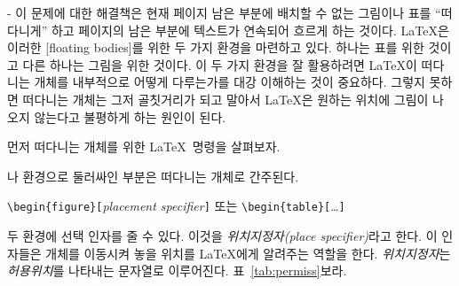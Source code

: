 \begin{adjustwidth}{0pt}{-\margheadwidth}
이 문제에 대한 해결책은 현재 페이지 남은 부분에 배치할 수 없는 그림이나 표를 ``떠다니게''
하고 페이지의 남은 부분에 텍스트가 연속되어 흐르게 하는 것이다.
\LaTeX 은 이러한 [floating bodies]를 위한 두 가지 환경을 마련하고 있다.
하나는 표를 위한 것이고 다른 하나는 그림을 위한 것이다.
이 두 가지 환경을 잘 활용하려면 \LaTeX 이 떠다니는 개체를 내부적으로 어떻게 다루는가를 
대강 이해하는 것이 중요하다.
그렇지 못하면 떠다니는 개체는 그저 골칫거리가 되고 말아서 \LaTeX 은 원하는 위치에 그림이 나오지 
않는다고 불평하게 하는 원인이 된다.

\bigskip
먼저 떠다니는 개체를 위한 \LaTeX\ 명령을 살펴보자.

나  환경으로 둘러싸인 부분은 떠다니는 개체로 간주된다.
\begin{lscommand}
\verb|\begin{figure}[|\emph{placement specifier}\verb|]| 
  또는
\verb|\begin{table}[|\ldots\verb|]|
\end{lscommand}
\noindent  두 환경에 선택 인자를 줄 수 있다. 이것을 \emph{위치지정자(place specifier)}라고 한다.
이 인자들은 개체를 이동시켜 놓을 위치를 \LaTeX 에게 알려주는 역할을 한다.
\emph{위치지정자}는 \emph{허용위치}를 나타내는 문자열로 이루어진다. 표~\ref{tab:permiss}\을 보라.%


\end{adjustwidth}
